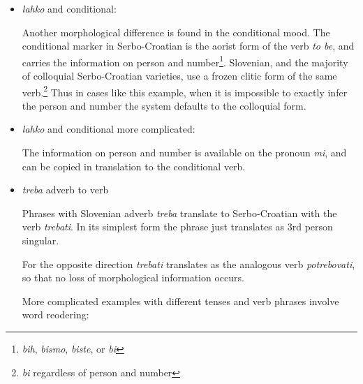 \begin{itemize}
\item \emph{lahko} and conditional:

Another morphological difference is found in the conditional
mood. The conditional marker in Serbo-Croatian is the aorist form of the verb
\emph{to be}, and carries the information on person and
number\footnote{\emph{bih}, \emph{bismo}, \emph{biste}, or \emph{bi}}. Slovenian, and the majority of colloquial Serbo-Croatian varieties, use
a frozen clitic form of the same verb.\footnote{\emph{bi} regardless of person and
number} Thus in cases like this example, when it is impossible to
exactly infer the person and number the system defaults to the
colloquial form.

\item \emph{lahko} and conditional more complicated:

The information on person and number is available on the pronoun
\emph{mi}, and can be copied in translation to the conditional verb.

\item \emph{treba} adverb to verb

Phrases with Slovenian adverb \emph{treba} translate to Serbo-Croatian with the
verb \emph{trebati}. In its simplest form the phrase just translates
as 3rd person singular.

For the opposite direction \emph{trebati} translates as the analogous
verb \emph{potrebovati}, so that no loss of morphological information occurs.


More complicated examples with different tenses and verb phrases involve word reodering:


\end{itemize}
